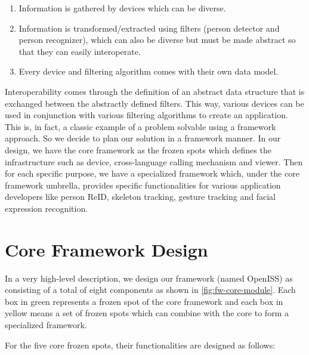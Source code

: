 \begin{enumerate}
    \item Information is gathered by devices which can be diverse.
    \item Information is transformed/extracted using filters (person detector 
    and person recognizer), which can also be diverse but must be made abstract 
    so that they can easily interoperate.
    \item Every device and filtering algorithm comes with their own data model.
\end{enumerate}

Interoperability comes through the definition of an abstract data
structure that is exchanged between the abstractly defined filters. This way,
various devices can be used in conjunction with various filtering algorithms to
create an application. This is, in fact, a classic example of a problem solvable
using a framework approach.
So we decide to plan our solution in a framework manner.
In our design, we have the core framework as the frozen spots which
defines the infrastructure such as device, cross-language calling mechanism and
viewer.
Then for each specific purpose, we have a specialized framework which, under the
core framework umbrella, provides specific functionalities for various
application developers like person ReID, skeleton tracking, gesture tracking
and facial expression recognition.

\section{Core Framework Design}
\label{sec:fw-design-core}

In a very high-level description, we design our framework (named OpenISS) as consisting of
a total of eight components as shown in \autoref{fig:fw-core-module}. Each box in
green represents a frozen spot of the core framework and each box in yellow
means a set of frozen spots which can combine with the core to form a
specialized framework.

For the five core frozen spots, their functionalities are designed as follows:

